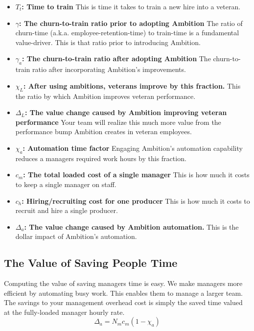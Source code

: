 \documentclass[paper=a4, fontsize=11pt abstract]{scrartcl}
\numberwithin{equation}{section}		%
\numberwithin{figure}{section}			%
\numberwithin{table}{section}				%
\begin{document}
\begin{itemize}
    \item $T_t$\textbf{: Time to train} This is time it takes to train a new hire into a veteran.
    
    \item $\gamma$\textbf{: The churn-to-train ratio prior to adopting Ambition} The ratio of churn-time (a.k.a. employee-retention-time) to train-time is a fundamental value-driver.  This is that ratio prior to introducing Ambition.
    
    \item $\gamma_a$\textbf{: The churn-to-train ratio after adopting Ambition} The churn-to-train ratio after incorporating Ambition's improvements.
    
    \item $\chi_L$\textbf{: After using ambitions, veterans improve by this fraction.} This the ratio by which Ambition improves veteran performance.
    
    \item $\Delta_L$\textbf{: The value change caused by Ambition improving veteran performance} Your team will realize this much more value from the performance bump Ambition creates in veteran employees.
    
    \item $\chi_a$\textbf{: Automation time factor} Engaging Ambition's automation capability reduces a managers required work hours by this fraction.
    
    \item $c_m$\textbf{: The total loaded cost of a single manager} This is how much it costs to keep a single manager on staff.
    
    \item $c_h$\textbf{: Hiring/recruiting cost for one producer} This is how much it costs to recruit and hire a single producer.
    
    \item $\Delta_a$\textbf{: The value change caused by Ambition automation.} This is the dollar impact of Ambition's automation.
\end{itemize}


\subsection{The Value of Saving People Time}
Computing the value of saving managers time is easy.
We make managers more efficient by automating busy work.
This enables them to manage a larger team.
The savings to your management overhead cost is simply the saved time valued at the fully-loaded manager hourly rate.
\begin{equation}
    \Delta_a = N_m c_m \left(1 - \chi_a\right)
\end{equation}
\end{document}
